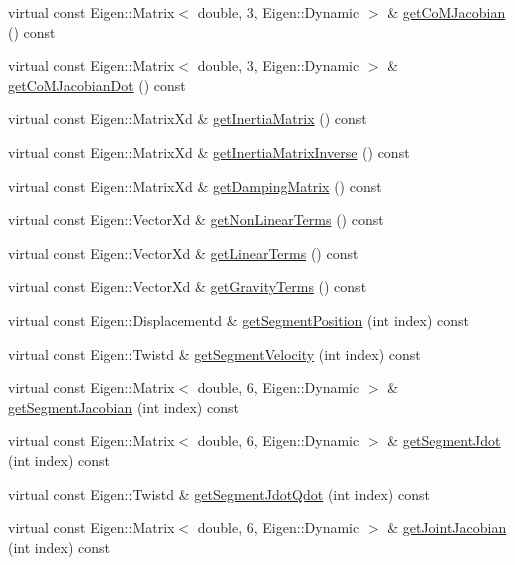 \begin{DoxyCompactItemize}
\item 
virtual const Eigen\+::\+Matrix$<$ double, 3, Eigen\+::\+Dynamic $>$ \& \hyperlink{classModel3T_addc6149d27f7cb5d3c8ab453e55b88e4}{get\+Co\+M\+Jacobian} () const
\item 
virtual const Eigen\+::\+Matrix$<$ double, 3, Eigen\+::\+Dynamic $>$ \& \hyperlink{classModel3T_a6b63e04105ce4fa8026681ea1109702e}{get\+Co\+M\+Jacobian\+Dot} () const
\item 
virtual const Eigen\+::\+Matrix\+Xd \& \hyperlink{classModel3T_a0ba3b76d91e6121e472ab316e17382e1}{get\+Inertia\+Matrix} () const
\item 
virtual const Eigen\+::\+Matrix\+Xd \& \hyperlink{classModel3T_a25860bdbf24d115cc7dafe75cc7a8197}{get\+Inertia\+Matrix\+Inverse} () const
\item 
virtual const Eigen\+::\+Matrix\+Xd \& \hyperlink{classModel3T_a5ed6794462c63bdd1eeabbfa221e2ef6}{get\+Damping\+Matrix} () const
\item 
virtual const Eigen\+::\+Vector\+Xd \& \hyperlink{classModel3T_af41d3f87cb77877320f4c589d9cf7ffe}{get\+Non\+Linear\+Terms} () const
\item 
virtual const Eigen\+::\+Vector\+Xd \& \hyperlink{classModel3T_a82b4a52bc8bf966a57a31e54e3efb80c}{get\+Linear\+Terms} () const
\item 
virtual const Eigen\+::\+Vector\+Xd \& \hyperlink{classModel3T_a593775a88272c140518b679ad910a89c}{get\+Gravity\+Terms} () const
\item 
virtual const Eigen\+::\+Displacementd \& \hyperlink{classModel3T_af2408d3a32ae4762ce3c5951360f5f67}{get\+Segment\+Position} (int index) const
\item 
virtual const Eigen\+::\+Twistd \& \hyperlink{classModel3T_ac94524afc47ca5c16045b53d6c5b6118}{get\+Segment\+Velocity} (int index) const
\item 
virtual const Eigen\+::\+Matrix$<$ double, 6, Eigen\+::\+Dynamic $>$ \& \hyperlink{classModel3T_a3c138d685389144406ab0bd219e7bb36}{get\+Segment\+Jacobian} (int index) const
\item 
virtual const Eigen\+::\+Matrix$<$ double, 6, Eigen\+::\+Dynamic $>$ \& \hyperlink{classModel3T_a24e4def66a047175935bf343f38a8b84}{get\+Segment\+Jdot} (int index) const
\item 
virtual const Eigen\+::\+Twistd \& \hyperlink{classModel3T_add0fcd2f4259009f964a03c6402d1ca9}{get\+Segment\+Jdot\+Qdot} (int index) const
\item 
virtual const Eigen\+::\+Matrix$<$ double, 6, Eigen\+::\+Dynamic $>$ \& \hyperlink{classModel3T_a6fd62404b6e74f239142c6a4de76d7e9}{get\+Joint\+Jacobian} (int index) const

\end{DoxyCompactItemize}
